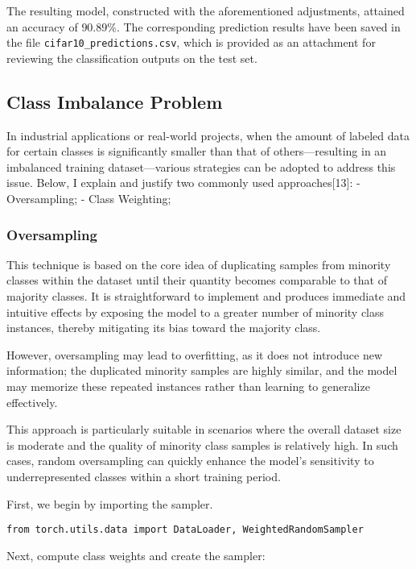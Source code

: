 The resulting model, constructed with the aforementioned adjustments,
attained an accuracy of \(90.89\%\). The corresponding prediction
results have been saved in the file \texttt{cifar10\_predictions.csv},
which is provided as an attachment for reviewing the classification
outputs on the test set.

\subsection{Class Imbalance Problem}\label{class-imbalance-problem}

In industrial applications or real-world projects, when the amount of
labeled data for certain classes is significantly smaller than that of
others---resulting in an imbalanced training dataset---various
strategies can be adopted to address this issue. Below, I explain and
justify two commonly used approaches{[}13{]}: - Oversampling; - Class
Weighting;

\subsubsection{Oversampling}\label{oversampling}

This technique is based on the core idea of duplicating samples from
minority classes within the dataset until their quantity becomes
comparable to that of majority classes. It is straightforward to
implement and produces immediate and intuitive effects by exposing the
model to a greater number of minority class instances, thereby
mitigating its bias toward the majority class.

However, oversampling may lead to overfitting, as it does not introduce
new information; the duplicated minority samples are highly similar, and
the model may memorize these repeated instances rather than learning to
generalize effectively.

This approach is particularly suitable in scenarios where the overall
dataset size is moderate and the quality of minority class samples is
relatively high. In such cases, random oversampling can quickly enhance
the model's sensitivity to underrepresented classes within a short
training period.

First, we begin by importing the sampler.

\begin{verbatim}
from torch.utils.data import DataLoader, WeightedRandomSampler
\end{verbatim}

Next, compute class weights and create the sampler:

